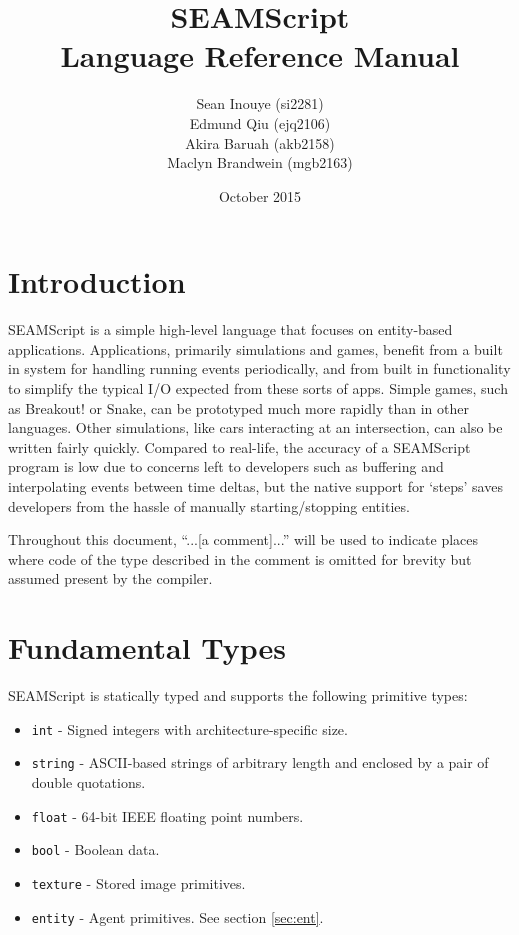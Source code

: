 \documentclass[titlepage]{article}
\title{{\bf{SEAMScript}} \\ Language Reference Manual}
\author{
Sean Inouye (si2281)\\
Edmund Qiu (ejq2106)\\
Akira Baruah (akb2158)\\
Maclyn Brandwein (mgb2163)}
\date{October 2015}
\begin{document}
\maketitle
\renewcommand{\cftsecleader}{\cftdotfill{\cftdotsep}}
\tableofcontents
\pagebreak


\section{Introduction}

SEAMScript is a simple high-level language that focuses on entity-based applications. Applications, primarily simulations and games, benefit from a built in system for handling running events periodically, and from built in functionality to simplify the typical I/O expected from these sorts of apps.  Simple games, such as Breakout! or Snake, can be prototyped much more rapidly than in other languages. Other simulations, like cars interacting at an intersection, can also be written fairly quickly. Compared to real-life, the accuracy of a SEAMScript program is low due to concerns left to developers such as buffering and interpolating events between time deltas, but the native support for ‘steps’ saves developers from the hassle of manually starting/stopping entities.

Throughout this document, “...[a comment]...” will be used to indicate places where code of the type described in the comment is omitted for brevity but assumed present by the compiler.


\section{Fundamental Types}
SEAMScript is statically typed and supports the following primitive types:

\begin{itemize}
\item \verb|int| - Signed integers with architecture-specific size.
\item \verb|string| - ASCII-based strings of arbitrary length and enclosed by a pair of double quotations.
\item \verb|float| - 64-bit IEEE floating point numbers.
\item \verb|bool| - Boolean data.
\item \verb|texture| - Stored image primitives.
\item \verb|entity| - Agent primitives. See section \ref{sec:ent}.
\end{itemize}
\end{document}
